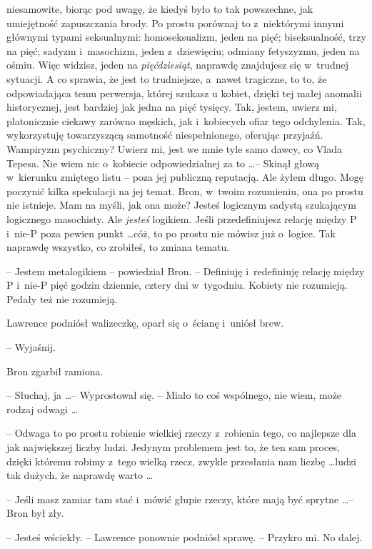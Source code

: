 \documentclass[oneside,polish,11pt,rmheadings]{mwbk}
\begin{document}
niesamowite, biorąc pod uwagę, że kiedyś było to tak powszechne, jak umiejętność zapuszczania brody. Po prostu porównaj to z~niektórymi innymi głównymi typami seksualnymi: homoseksualizm, jeden na pięć; biseksualność, trzy na pięć; sadyzm i~masochizm, jeden z~dziewięciu; odmiany fetyszyzmu, jeden na ośmiu. Więc widzisz, jeden na \textit{pięćdziesiąt}, naprawdę znajdujesz się w~trudnej sytuacji. A co sprawia, że jest to trudniejsze, a~nawet tragiczne, to to, że odpowiadająca temu perwersja, której szukasz u kobiet, dzięki tej małej anomalii historycznej, jest bardziej jak jedna na pięć tysięcy. Tak, jestem, uwierz mi, platonicznie ciekawy zarówno męskich, jak i~kobiecych ofiar tego odchylenia. Tak, wykorzystuję towarzyszącą samotność niespełnionego, oferując przyjaźń. Wampiryzm psychiczny? Uwierz mi, jest we mnie tyle samo dawcy, co Vlada Tepesa. Nie wiem nic o~kobiecie odpowiedzialnej za to \ldots  -- Skinął głową w~kierunku zmiętego listu -- poza jej publiczną reputacją. Ale żyłem długo. Mogę poczynić kilka spekulacji na jej temat. Bron, w~twoim rozumieniu, ona po prostu nie istnieje. Mam na myśli, jak ona może? Jesteś logicznym sadystą szukającym logicznego masochisty. Ale \textit{jesteś }logikiem. Jeśli przedefiniujesz relację między P i~nie-P poza pewien punkt \ldots cóż, to po prostu nie mówisz już o~logice. Tak naprawdę wszystko, co zrobiłeś, to zmiana tematu. 

-- Jestem metalogikiem -- powiedział Bron. -- Definiuję i~redefiniuję relację między P i~nie-P pięć godzin dziennie, cztery dni w~tygodniu. Kobiety nie rozumieją. Pedały też nie rozumieją. 

Lawrence podniósł walizeczkę, oparł się o~ścianę i~uniósł brew. 

--  Wyjaśnij. 

Bron zgarbił ramiona. 

-- Słuchaj, ja \ldots  -- Wyprostował się. -- Miało to coś wspólnego, nie wiem, może rodzaj odwagi \ldots  

-- Odwaga to po prostu robienie wielkiej rzeczy z~robienia tego, co najlepsze dla jak największej liczby ludzi. Jedynym problemem jest to, że ten sam proces, dzięki któremu robimy z~tego wielką rzecz, zwykle przesłania nam liczbę \ldots  ludzi tak dużych, że naprawdę warto \ldots  

-- Jeśli masz zamiar tam stać i~mówić głupie rzeczy, które mają być sprytne \ldots  -- Bron był zły. 

-- Jesteś wściekły. --  Lawrence ponownie podniósł sprawę. -- Przykro mi. No dalej. 
\end{document}
